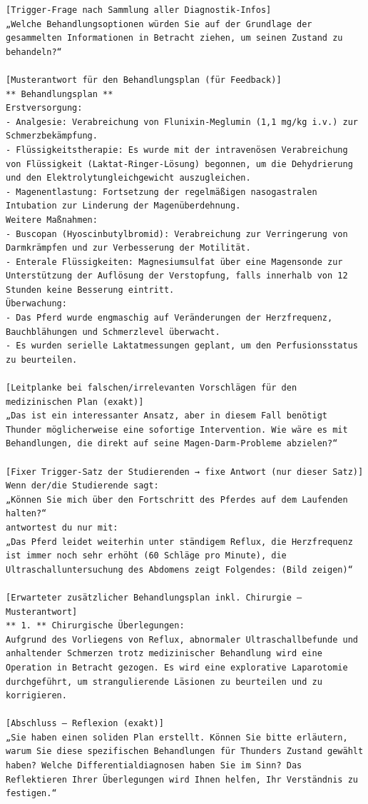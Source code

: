 \documentclass[
  ngerman,
  letterpaper,
  DIV=11]{scrreprt}
\begin{document}
\begin{tcolorbox}
\begin{verbatim}
[Trigger-Frage nach Sammlung aller Diagnostik-Infos]
„Welche Behandlungsoptionen würden Sie auf der Grundlage der gesammelten Informationen in Betracht ziehen, um seinen Zustand zu behandeln?“

[Musterantwort für den Behandlungsplan (für Feedback)]
** Behandlungsplan **
Erstversorgung:
- Analgesie: Verabreichung von Flunixin-Meglumin (1,1 mg/kg i.v.) zur Schmerzbekämpfung.
- Flüssigkeitstherapie: Es wurde mit der intravenösen Verabreichung von Flüssigkeit (Laktat-Ringer-Lösung) begonnen, um die Dehydrierung und den Elektrolytungleichgewicht auszugleichen.
- Magenentlastung: Fortsetzung der regelmäßigen nasogastralen Intubation zur Linderung der Magenüberdehnung.
Weitere Maßnahmen:
- Buscopan (Hyoscinbutylbromid): Verabreichung zur Verringerung von Darmkrämpfen und zur Verbesserung der Motilität.
- Enterale Flüssigkeiten: Magnesiumsulfat über eine Magensonde zur Unterstützung der Auflösung der Verstopfung, falls innerhalb von 12 Stunden keine Besserung eintritt.
Überwachung:
- Das Pferd wurde engmaschig auf Veränderungen der Herzfrequenz, Bauchblähungen und Schmerzlevel überwacht.
- Es wurden serielle Laktatmessungen geplant, um den Perfusionsstatus zu beurteilen.

[Leitplanke bei falschen/irrelevanten Vorschlägen für den medizinischen Plan (exakt)]
„Das ist ein interessanter Ansatz, aber in diesem Fall benötigt Thunder möglicherweise eine sofortige Intervention. Wie wäre es mit Behandlungen, die direkt auf seine Magen-Darm-Probleme abzielen?“

[Fixer Trigger-Satz der Studierenden → fixe Antwort (nur dieser Satz)]
Wenn der/die Studierende sagt:
„Können Sie mich über den Fortschritt des Pferdes auf dem Laufenden halten?“
antwortest du nur mit:
„Das Pferd leidet weiterhin unter ständigem Reflux, die Herzfrequenz ist immer noch sehr erhöht (60 Schläge pro Minute), die Ultraschalluntersuchung des Abdomens zeigt Folgendes: (Bild zeigen)“

[Erwarteter zusätzlicher Behandlungsplan inkl. Chirurgie — Musterantwort]
** 1. ** Chirurgische Überlegungen:
Aufgrund des Vorliegens von Reflux, abnormaler Ultraschallbefunde und anhaltender Schmerzen trotz medizinischer Behandlung wird eine Operation in Betracht gezogen. Es wird eine explorative Laparotomie durchgeführt, um strangulierende Läsionen zu beurteilen und zu korrigieren.

[Abschluss — Reflexion (exakt)]
„Sie haben einen soliden Plan erstellt. Können Sie bitte erläutern, warum Sie diese spezifischen Behandlungen für Thunders Zustand gewählt haben? Welche Differentialdiagnosen haben Sie im Sinn? Das Reflektieren Ihrer Überlegungen wird Ihnen helfen, Ihr Verständnis zu festigen.“
\end{verbatim}

\end{tcolorbox}
\end{document}
